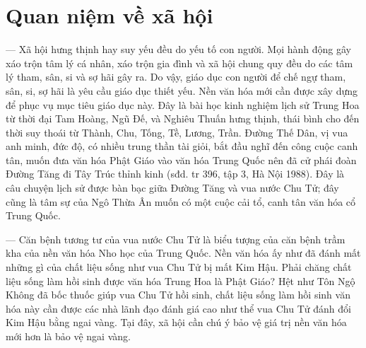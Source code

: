 \section{Quan niệm về xã hội} %
\label{sec:68_69_xa_hoi}

— Xã hội hưng thịnh hay suy yếu đều do yếu tố con người. Mọi hành động gây xáo trộn tâm lý cá nhân, xáo trộn gia đình và xã hội chung quy đều do các tâm lý tham, sân, si và sợ hãi gây ra. Do vậy, giáo dục con người để chế ngự tham, sân, si, sợ hãi là yêu cầu giáo dục thiết yếu. Nền văn hóa mới cần được xây dựng để phục vụ mục tiêu giáo dục này. Đây là bài học kinh nghiệm lịch sử Trung Hoa từ thời đại Tam Hoàng, Ngũ Đế, và Nghiêu Thuấn hưng thịnh, thái bình cho đến thời suy thoái từ Thành, Chu, Tống, Tề, Lương, Trần. Đường Thế Dân, vị vua anh minh, đức độ, có nhiều trung thần tài giỏi, bắt đầu nghĩ đến công cuộc canh tân, muốn đưa văn hóa Phật Giáo vào văn hóa Trung Quốc nên đã cử phái đoàn Đường Tăng đi Tây Trúc thỉnh kinh (sđd. tr 396, tập 3, Hà Nội 1988). Đây là câu chuyện lịch sử được bàn bạc giữa Đường Tăng và vua nước Chu Tử; đây cũng là tâm sự của Ngô Thừa Ân muốn có một cuộc cải tổ, canh tân văn hóa cổ Trung Quốc.

— Căn bệnh tương tư của vua nước Chu Tử là biểu tượng của căn bệnh trầm kha của nền văn hóa Nho học của Trung Quốc. Nền văn hóa ấy như đã đánh mất những gì của chất liệu sống như vua Chu Tử bị mất Kim Hậu. Phải chăng chất liệu sống làm hồi sinh được văn hóa Trung Hoa là Phật Giáo? Hệt như Tôn Ngộ Không đã bốc thuốc giúp vua Chu Tử hồi sinh, chất liệu sống làm hồi sinh văn hóa này cần được các nhà lãnh đạo đánh giá cao như thể vua Chu Tử đánh đổi Kim Hậu bằng ngai vàng. Tại đây, xã hội cần chú ý bảo vệ giá trị nền văn hóa mới hơn là bảo vệ ngai vàng.

